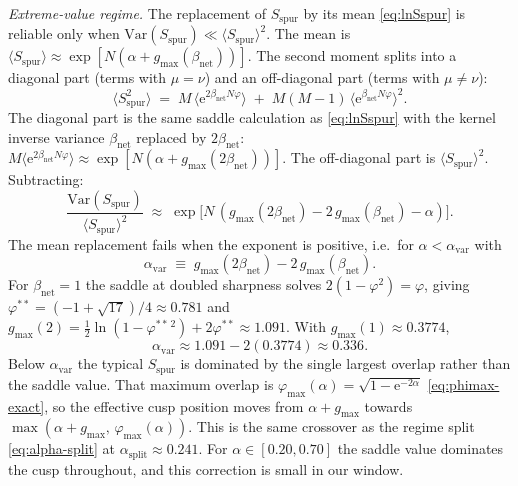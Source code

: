 \documentclass[11pt]{article}
\newcommand{\e}{{\mathrm{e}}}
\newcommand{\Bnet}{\beta_{\mathrm{net}}}
\begin{document}
\textit{Extreme-value regime.}
The replacement of $S_{\mathrm{spur}}$ by its mean
\eqref{eq:lnSspur} is reliable only when
$\mathrm{Var}(S_{\mathrm{spur}}) \ll \langle S_{\mathrm{spur}}
\rangle^2$.  The mean is
$\langle S_{\mathrm{spur}}\rangle \approx
\exp[N(\alpha + g_{\max}(\Bnet))]$.  The second moment splits into a
diagonal part (terms with $\mu = \nu$) and an off-diagonal part
(terms with $\mu \neq \nu$):
\begin{equation}
\langle S_{\mathrm{spur}}^2\rangle
   \;=\; M\,\langle\e^{2\Bnet N \varphi}\rangle
     \;+\; M(M-1)\,\langle\e^{\Bnet N \varphi}\rangle^2.
\label{eq:Sspur-sq}
\end{equation}
The diagonal part is the same saddle calculation as
\eqref{eq:lnSspur} with the kernel inverse variance $\Bnet$ replaced
by $2\Bnet$:
$M\langle\e^{2\Bnet N \varphi}\rangle \approx
\exp[N(\alpha + g_{\max}(2\Bnet))]$.  The off-diagonal part is
$\langle S_{\mathrm{spur}}\rangle^2$.  Subtracting:
\begin{equation}
\frac{\mathrm{Var}(S_{\mathrm{spur}})}
     {\langle S_{\mathrm{spur}}\rangle^2}
   \;\approx\; \exp\!\bigl[N\,
     (g_{\max}(2\Bnet) - 2\,g_{\max}(\Bnet) - \alpha)\bigr].
\label{eq:var-ratio}
\end{equation}
The mean replacement fails when the exponent is positive, i.e.\ for
$\alpha < \alpha_{\mathrm{var}}$ with
\begin{equation}
\alpha_{\mathrm{var}} \;\equiv\; g_{\max}(2\Bnet) - 2\,g_{\max}(\Bnet).
\label{eq:lvar}
\end{equation}
For $\Bnet = 1$ the saddle at doubled sharpness solves
$2(1 - \varphi^2) = \varphi$, giving $\varphi^{**} =
(-1 + \sqrt{17})/4 \approx 0.781$ and
$g_{\max}(2) = \tfrac12 \ln(1 - \varphi^{**\,2}) + 2 \varphi^{**}
\approx 1.091$.  With $g_{\max}(1) \approx 0.3774$,
\begin{equation}
\alpha_{\mathrm{var}}
   \approx 1.091 - 2(0.3774) \approx 0.336.
\label{eq:lvar-num}
\end{equation}
Below $\alpha_{\mathrm{var}}$ the typical $S_{\mathrm{spur}}$ is
dominated by the single largest overlap rather than the saddle
value.  That maximum overlap is
$\varphi_{\max}(\alpha) = \sqrt{1 - \e^{-2\alpha}}$
\eqref{eq:phimax-exact}, so the effective cusp position moves from
$\alpha + g_{\max}$ towards $\max(\alpha + g_{\max},\,
\varphi_{\max}(\alpha))$.  This is the same crossover as the regime
split \eqref{eq:alpha-split} at $\alpha_{\mathrm{split}} \approx
0.241$.  For $\alpha \in [0.20, 0.70]$ the saddle value dominates the
cusp throughout, and this correction is small in our window.
\end{document}
